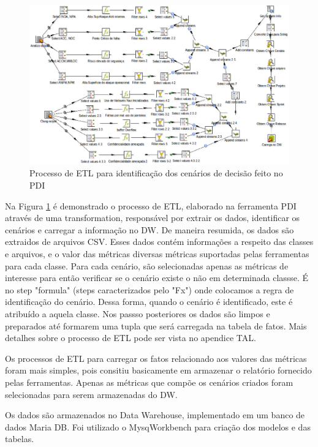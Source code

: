 \begin{figure}[!htb]
 	\centering
 		\includegraphics[scale=0.5]{figuras/dw-etlpdi}
 		\caption{Processo de ETL para identificação dos cenários de decisão feito no PDI}
 		\label{dw-etl-pdi}
 \end{figure}

Na Figura \ref{dw-etl-pdi} é demonstrado o processo de ETL, elaborado na ferramenta PDI através de uma transformation, responsável por extrair os dados, identificar os cenários e carregar a informação no DW. De maneira resumida, os dados são extraidos de arquivos CSV. Esses dados contém informações a respeito das classes e arquivos, e o valor das métricas diversas métricas suportadas pelas ferramentas para cada classe. Para cada cenário, são selecionadas apenas as métricas de interesse para então verificar se o cenário existe o não em determinada classse. É no step "formula" (steps caracterizados pelo "Fx") onde colocamos a regra de identificação do cenário. Dessa forma, quando o cenário é identificado, este é atribuído a aquela classe. Nos passso posteriores os dados são limpos e preparados até formarem uma tupla que será carregada na tabela de fatos. Mais detalhes sobre o processo de ETL pode ser vista no apendice TAL.


Os processos de ETL para carregar os fatos relacionado aos valores das métricas foram mais simples, pois consitiu basicamente em armazenar o relatório fornecido pelas ferramentas. Apenas as métricas que compõe os cenários criados foram selecionadas para serem armazenadas do DW.


Os dados são armazenados no Data Warehouse, implementado em um banco de dados Maria DB. Foi utilizado o MysqWorkbench para criação dos modelos e das tabelas.



